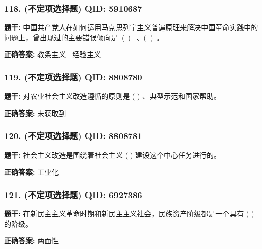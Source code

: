 \documentclass[12pt,UTF8]{ctexart}
\begin{document}
\vspace{0.3em}\hrulefill\vspace{0.7em}

\subsubsection*{118. (不定项选择题) \small QID: 5910687}

\textbf{题干:}
中国共产党人在如何运用马克思列宁主义普遍原理来解决中国革命实践中的问题上，曾出现过的主要错误倾向是 ( )  、( ) 。

\textbf{正确答案:}
教条主义 | 经验主义

\vspace{0.3em}\hrulefill\vspace{0.7em}

\subsubsection*{119. (不定项选择题) \small QID: 8808780}

\textbf{题干:}
对农业社会主义改造遵循的原则是 ( ) 、典型示范和国家帮助。

\textbf{正确答案:}
未获取到

\vspace{0.3em}\hrulefill\vspace{0.7em}

\subsubsection*{120. (不定项选择题) \small QID: 8808781}

\textbf{题干:}
社会主义改造是围绕着社会主义 ( ) 建设这个中心任务进行的。

\textbf{正确答案:}
工业化

\vspace{0.3em}\hrulefill\vspace{0.7em}

\subsubsection*{121. (不定项选择题) \small QID: 6927386}

\textbf{题干:}
在新民主主义革命时期和新民主主义社会，民族资产阶级都是一个具有 ( ) 的阶级。

\textbf{正确答案:}
两面性

\vspace{0.3em}\hrulefill\vspace{0.7em}
\end{document}
